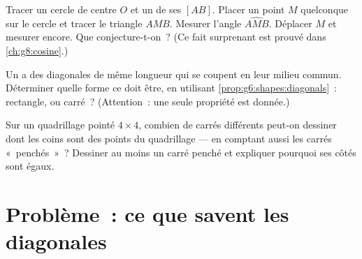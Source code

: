 \begin{exercise}[$\star\star$]\label{exo:g6:shapes:10}
Tracer un cercle de centre $O$ et un de ses  $[AB]$. Placer
un point $M$ quelconque sur le cercle et tracer le triangle $AMB$.
Mesurer l'angle $\widehat{AMB}$. Déplacer $M$ et mesurer encore. Que
conjecture-t-on~? (Ce fait surprenant est prouvé dans
\cref{ch:g8:cosine}.)
\end{exercise}

\begin{exercise}[$\star\star$]\label{exo:g6:shapes:11}
Un  a des diagonales de même longueur qui se coupent en
leur milieu commun. Déterminer quelle forme ce doit être, en utilisant
\cref{prop:g6:shapes:diagonals}~: rectangle,  ou carré~?
(Attention~: une seule propriété est donnée.)
\end{exercise}

\begin{exercise}[$\star\star\star$]\label{exo:g6:shapes:12}
Sur un quadrillage pointé $4 \times 4$, combien de carrés différents
peut-on dessiner dont les coins sont des points du quadrillage --- en
comptant aussi les carrés «~penchés~»~? Dessiner au moins un carré
penché et expliquer pourquoi ses côtés sont égaux.
\end{exercise}

\section{Problème~: ce que savent les diagonales}

